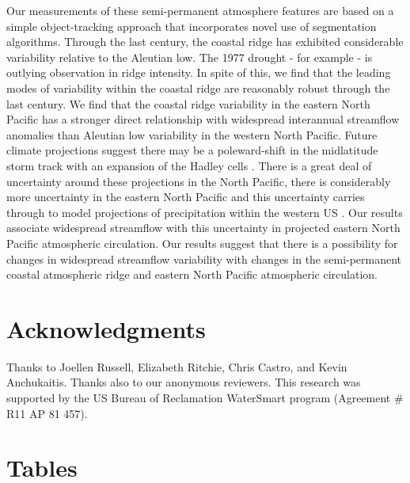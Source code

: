 \documentclass[final, double]{ua-thesis}
\begin{document}
Our measurements of these semi-permanent atmosphere features are based on a simple object-tracking approach that incorporates novel use of segmentation algorithms. Through the last century, the coastal ridge has exhibited considerable variability relative to the Aleutian low. The 1977 drought - for example - is  outlying observation in ridge intensity. In spite of this, we find that the leading modes of variability within the coastal ridge are reasonably robust through the last century. We find that the coastal ridge variability in the eastern North Pacific has a stronger direct relationship with widespread interannual streamflow anomalies than Aleutian low variability in the western North Pacific. Future climate projections suggest there may be a poleward-shift in the midlatitude storm track with an expansion of the Hadley cells \citep[e.g., ][]{2frierson_width_2007, 2scheff_twenty-first-century_2012, 2neelin_california_2013, 2chang_significant_2015, 2langenbrunner_patterns_2015, 2choi_uncertainty_2016}. There is a great deal of uncertainty around these projections in the North Pacific, there is considerably more uncertainty in the eastern North Pacific and this uncertainty carries through to model projections of precipitation within the western US \citep[e.g., ][]{2chang_significant_2015, 2langenbrunner_patterns_2015, 2choi_uncertainty_2016}. Our results associate widespread streamflow with this uncertainty in projected eastern North Pacific atmospheric circulation. Our results suggest that there is a possibility for changes in widespread streamflow variability with changes in the semi-permanent coastal atmospheric ridge and eastern North Pacific atmospheric circulation.


\section{Acknowledgments}
Thanks to Joellen Russell, Elizabeth Ritchie, Chris Castro, and Kevin Anchukaitis. Thanks also to our anonymous reviewers. This research was supported by the US Bureau of Reclamation WaterSmart program (Agreement \# R11 AP 81 457). 


\clearpage
\section{Tables}
\end{document}
